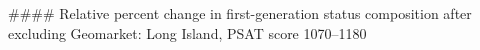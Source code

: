 #### Relative percent change in first-generation status composition after excluding Geomarket: Long Island, PSAT score 1070–1180
